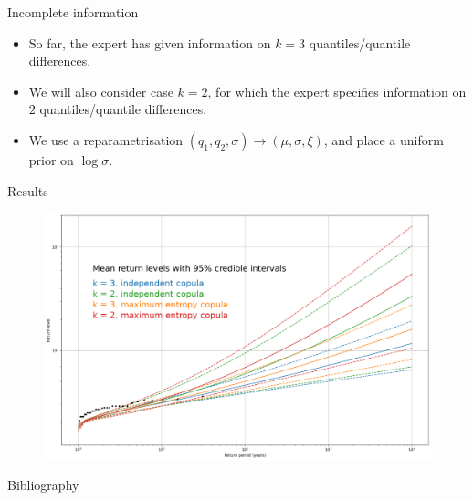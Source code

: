 \documentclass[10pt]{beamer}
\begin{document}
%
%
\begin{frame}{Incomplete information}{}
%
\begin{itemize}
	\item So far, the expert has given information on $k = 3$
		quantiles/quantile differences. 
	\item We will also consider case $k = 2$, for which the expert
		specifies information on $2$ quantiles/quantile differences.
	\item We use a reparametrisation
		$(q_1, q_2, \sigma) \to (\mu, \sigma, \xi)$,
		and place a uniform prior on $\log \sigma$.
\end{itemize}
%
\end{frame}
%
%
\begin{frame}{Results}{}
%
\begin{figure}
	\centering
	\includegraphics[width=\linewidth]{plots/rl_text.pdf}
\end{figure}
%
\end{frame}
%
%
\begin{frame}{Bibliography}{}
%
\printbibliography
\end{frame}
%
%
\end{document}
